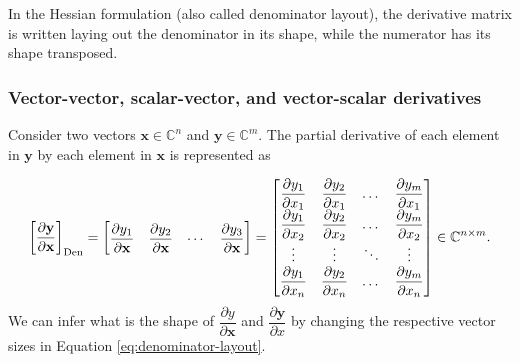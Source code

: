 \documentclass{article}
\begin{document}
In the Hessian formulation (also called denominator layout), the derivative matrix is written laying out the denominator in its shape, while the numerator has its shape transposed.

\subsubsection{Vector-vector, scalar-vector, and vector-scalar derivatives}
Consider two vectors \(\mathbf{x} \in \mathbb{C}^n\) and \(\mathbf{y} \in \mathbb{C}^m\). The partial derivative of each element in \(\mathbf{y}\) by each element in \(\mathbf{x}\) is represented as

\begin{align}
    \label{eq:denominator-layout}
    \left[ \dfrac{\partial \mathbf{y}}{\partial \mathbf{x}} \right]_{\textnormal{Den}} = \begin{bmatrix}
        \dfrac{\partial y_1}{\partial \mathbf{x}} & \dfrac{\partial y_2}{\partial \mathbf{x}} & \cdots & \dfrac{\partial y_3}{\partial \mathbf{x}}
    \end{bmatrix} = \begin{bmatrix}
        \dfrac{\partial y_1}{\partial x_1} & \dfrac{\partial y_2}{\partial x_1} & \dots & \dfrac{\partial y_m}{\partial x_1} \\
        \dfrac{\partial y_1}{\partial x_2} & \dfrac{\partial y_2}{\partial x_2} & \dots & \dfrac{\partial y_m}{\partial x_2} \\
        \vdots & \vdots & \ddots & \vdots \\
        \dfrac{\partial y_1}{\partial x_n} & \dfrac{\partial y_2}{\partial x_n} & \dots & \dfrac{\partial y_m}{\partial x_n} \\
    \end{bmatrix} \in \mathbb{C}^{n\times m}.
\end{align}
We can infer what is the shape of \(\dfrac{\partial y}{\partial \mathbf{x}}\) and \(\dfrac{\partial \mathbf{y}}{\partial x}\) by changing the respective vector sizes in Equation \eqref{eq:denominator-layout}.
\end{document}
